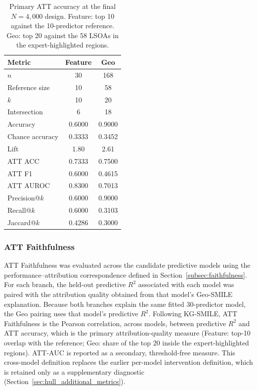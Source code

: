 \begin{table}[H]
\centering
\caption{Primary ATT accuracy at the final $N=4{,}000$ design. Feature: top 10 against the 10-predictor reference. Geo: top 20 against the 58 LSOAs in the expert-highlighted regions.}
\label{tab:hull_att_accuracy_primary}
\small
\begin{tabular}{lcc}
\toprule
Metric & Feature & Geo \\
\midrule
$n$             & 30     & 168 \\
Reference size  & 10     & 58 \\
$k$             & 10     & 20 \\
Intersection    & 6      & 18 \\
Accuracy        & 0.6000 & 0.9000 \\
Chance accuracy & 0.3333 & 0.3452 \\
Lift            & 1.80   & 2.61 \\
ATT ACC         & 0.7333 & 0.7500 \\
ATT F1          & 0.6000 & 0.4615 \\
ATT AUROC       & 0.8300 & 0.7013 \\
Precision@$k$   & 0.6000 & 0.9000 \\
Recall@$k$      & 0.6000 & 0.3103 \\
Jaccard@$k$     & 0.4286 & 0.3000 \\
\bottomrule
\end{tabular}
\end{table}


\subsubsection{ATT Faithfulness}
\label{sec:hull_faithfulness}

ATT Faithfulness was evaluated across the candidate predictive models using
the performance--attribution correspondence defined in
Section~\ref{subsec:faithfulness}. For each branch, the held-out predictive
$R^2$ associated with each model was paired with the attribution quality
obtained from that model's Geo-SMILE explanation. Because both branches
explain the same fitted 30-predictor model, the Geo pairing uses that model's
predictive $R^2$. Following KG-SMILE, ATT Faithfulness is the Pearson
correlation, across models, between predictive $R^2$ and ATT accuracy, which is
the primary attribution-quality measure (Feature: top-10 overlap with the
reference; Geo: share of the top 20 inside the expert-highlighted regions).
ATT-AUC is reported as a secondary, threshold-free measure. This cross-model
definition replaces the earlier per-model intervention definition, which is
retained only as a supplementary diagnostic
(Section~\ref{sec:hull_additional_metrics}).

